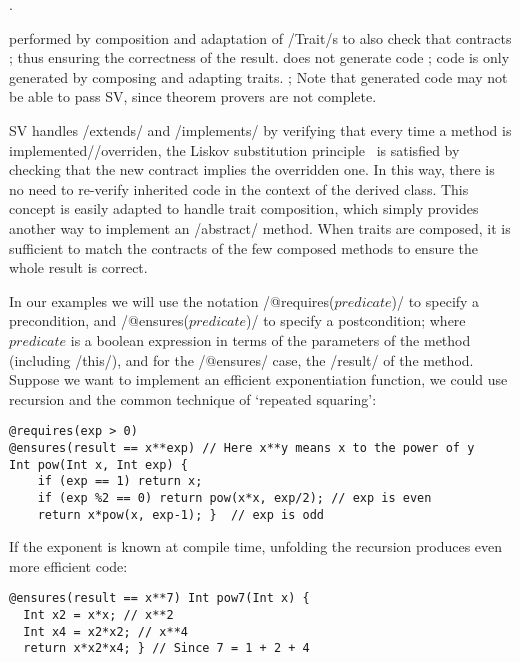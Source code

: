 .

 performed by composition and adaptation of /Trait/s to also check that contracts ; thus ensuring the correctness of the result.
%
%
 does not generate code ;  code is only generated by composing and adapting traits.
; 
Note that generated code may not be able to pass SV, since theorem provers are not complete.


SV handles /extends/ and /implements/ by verifying that every 
time a method is implemented//overriden, 
the Liskov substitution principle~\cite{Liskov:1994:BNS:197320.197383} is satisfied
by checking that the new contract implies the
overridden one. 
 In this way, there is no need to re-verify
inherited code in the context of the derived class.
This concept is easily adapted
to handle trait composition, which simply provides another way to implement an /abstract/ method.
When traits are composed,
it is sufficient
to match the contracts of the few composed methods
to ensure the whole result is correct.

In our examples we will use the notation /@requires($predicate$)/ 
to specify a precondition, and /@ensures($predicate$)/ 
to specify a postcondition; where $predicate$ is a boolean expression
in terms of the parameters of the method (including /this/), and for the /@ensures/ case, the /result/ of the method.
Suppose we want to implement an efficient exponentiation function, we could use recursion and the common technique of `repeated squaring':
\vspace{-1ex}
\begin{lstlisting}
@requires(exp > 0)
@ensures(result == x**exp) // Here x**y means x to the power of y
Int pow(Int x, Int exp) {
	if (exp == 1) return x;
	if (exp %2 == 0) return pow(x*x, exp/2); // exp is even
	return x*pow(x, exp-1); }  // exp is odd
\end{lstlisting}
If the exponent is known at compile time,
unfolding the recursion produces even more efficient code:
\vspace{-1ex}
\begin{lstlisting}[firstnumber=7]
@ensures(result == x**7) Int pow7(Int x) { 
  Int x2 = x*x; // x**2
  Int x4 = x2*x2; // x**4
  return x*x2*x4; } // Since 7 = 1 + 2 + 4
\end{lstlisting}
\vspace{-1ex}


